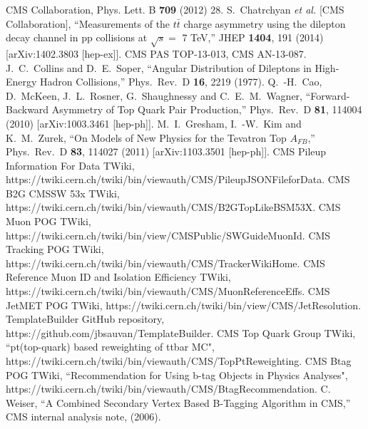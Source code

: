 \documentclass{cmspaperpdf}
\begin{document}
\begin{thebibliography}{9}
  CMS Collaboration, Phys. Lett. B \textbf{709} (2012) 28.
  S.~Chatrchyan {\it et al.}  [CMS Collaboration],
  ``Measurements of the $t\bar{t}$ charge asymmetry using the dilepton decay channel in pp collisions at $\sqrt{s} =$ 7 TeV,''
  JHEP {\bf 1404}, 191 (2014)
  [arXiv:1402.3803 [hep-ex]].
  CMS PAS TOP-13-013, CMS AN-13-087.
  J.~C.~Collins and D.~E.~Soper,
  ``Angular Distribution of Dileptons in High-Energy Hadron Collisions,''
  Phys.\ Rev.\ D {\bf 16}, 2219 (1977).
  Q.~-H.~Cao, D.~McKeen, J.~L.~Rosner, G.~Shaughnessy and C.~E.~M.~Wagner,
  ``Forward-Backward Asymmetry of Top Quark Pair Production,''
  Phys.\ Rev.\ D {\bf 81}, 114004 (2010)
  [arXiv:1003.3461 [hep-ph]].
  M.~I.~Gresham, I.~-W.~Kim and K.~M.~Zurek,
  ``On Models of New Physics for the Tevatron Top $A_{FB}$,''
  Phys.\ Rev.\ D {\bf 83}, 114027 (2011)
  [arXiv:1103.3501 [hep-ph]].
  CMS Pileup Information For Data TWiki, https://twiki.cern.ch/twiki/bin/viewauth/CMS/PileupJSONFileforData.
  CMS B2G CMSSW 53x TWiki, https://twiki.cern.ch/twiki/bin/viewauth/CMS/B2GTopLikeBSM53X.
  CMS Muon POG TWiki, https://twiki.cern.ch/twiki/bin/view/CMSPublic/SWGuideMuonId.
  CMS Tracking POG TWiki, https://twiki.cern.ch/twiki/bin/viewauth/CMS/TrackerWikiHome.
  CMS Reference Muon ID and Isolation Efficiency TWiki, https://twiki.cern.ch/twiki/bin/viewauth/CMS/MuonReferenceEffs.
  CMS JetMET POG TWiki, https://twiki.cern.ch/twiki/bin/view/CMS/JetResolution.
  TemplateBuilder GitHub repository, https://github.com/jbsauvan/TemplateBuilder.
  CMS Top Quark Group TWiki, ``pt(top-quark) based reweighting of ttbar MC", https://twiki.cern.ch/twiki/bin/viewauth/CMS/TopPtReweighting.
  CMS Btag POG TWiki, ``Recommendation for Using b-tag Objects in Physics Analyses", https://twiki.cern.ch/twiki/bin/viewauth/CMS/BtagRecommendation.
  C. Weiser, ``A Combined Secondary Vertex Based B-Tagging Algorithm in CMS,'' CMS internal analysis note, (2006).

\end{thebibliography}
\end{document}
